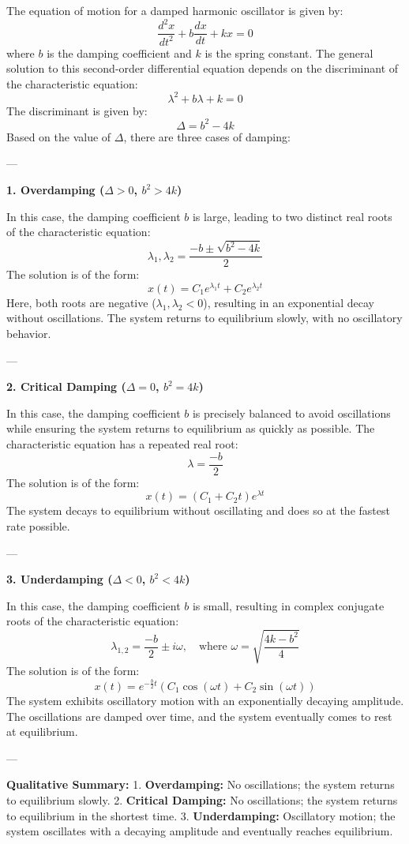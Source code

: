 \documentclass{article}
\begin{document}
The equation of motion for a damped harmonic oscillator is given by:
\[
\frac{d^2x}{dt^2} + b\frac{dx}{dt} + kx = 0
\]
where \(b\) is the damping coefficient and \(k\) is the spring constant. The general solution to this second-order differential equation depends on the discriminant of the characteristic equation:
\[
\lambda^2 + b\lambda + k = 0
\]
The discriminant is given by:
\[
\Delta = b^2 - 4k
\]
Based on the value of \(\Delta\), there are three cases of damping:

---

\textbf{1. Overdamping (\(\Delta > 0\), \(b^2 > 4k\))}

In this case, the damping coefficient \(b\) is large, leading to two distinct real roots of the characteristic equation:
\[
\lambda_1, \lambda_2 = \frac{-b \pm \sqrt{b^2 - 4k}}{2}
\]
The solution is of the form:
\[
x(t) = C_1 e^{\lambda_1 t} + C_2 e^{\lambda_2 t}
\]
Here, both roots are negative (\(\lambda_1, \lambda_2 < 0\)), resulting in an exponential decay without oscillations. The system returns to equilibrium slowly, with no oscillatory behavior.

---

\textbf{2. Critical Damping (\(\Delta = 0\), \(b^2 = 4k\))}

In this case, the damping coefficient \(b\) is precisely balanced to avoid oscillations while ensuring the system returns to equilibrium as quickly as possible. The characteristic equation has a repeated real root:
\[
\lambda = \frac{-b}{2}
\]
The solution is of the form:
\[
x(t) = (C_1 + C_2 t) e^{\lambda t}
\]
The system decays to equilibrium without oscillating and does so at the fastest rate possible.

---

\textbf{3. Underdamping (\(\Delta < 0\), \(b^2 < 4k\))}

In this case, the damping coefficient \(b\) is small, resulting in complex conjugate roots of the characteristic equation:
\[
\lambda_{1,2} = \frac{-b}{2} \pm i \omega, \quad \text{where } \omega = \sqrt{\frac{4k - b^2}{4}}
\]
The solution is of the form:
\[
x(t) = e^{-\frac{b}{2}t} \left(C_1 \cos(\omega t) + C_2 \sin(\omega t)\right)
\]
The system exhibits oscillatory motion with an exponentially decaying amplitude. The oscillations are damped over time, and the system eventually comes to rest at equilibrium.

---

\textbf{Qualitative Summary:}
1. \textbf{Overdamping:} No oscillations; the system returns to equilibrium slowly.
2. \textbf{Critical Damping:} No oscillations; the system returns to equilibrium in the shortest time.
3. \textbf{Underdamping:} Oscillatory motion; the system oscillates with a decaying amplitude and eventually reaches equilibrium.
\end{document}
